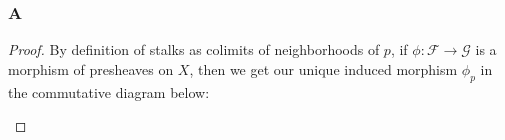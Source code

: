 \documentclass{article}
\newcommand{\fF}{\mathscr{F}}
\newcommand{\fG}{\mathscr{G}}
\DeclareMathOperator{\res}{\mathrm{res}}
\begin{document}
\subsubsection{A}\label{2.3.A}
\begin{proof}
    By definition of stalks as colimits of neighborhoods of $p$, if $\phi:\fF\to \fG$ is a morphism of presheaves on $X$, then we get our unique induced morphism $\phi_p$ in the commutative diagram below:
    \begin{center}
    \end{center}
\end{proof}
\end{document}
